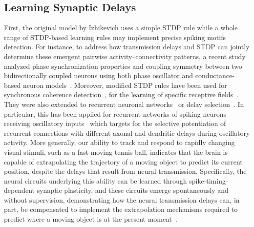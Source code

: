 \documentclass[brainsci, %
               review,accept,pdftex,moreauthors
               ]{Definitions/mdpi}
\begin{document}
% 
\subsection{Learning Synaptic Delays}
First, the original model by Izhikevich uses a simple STDP rule while a whole range of STDP-based learning rules may implement precise spiking motifs detection. For instance, to address how transmission delays and STDP can jointly determine these emergent pairwise activity--connectivity patterns, a recent study analyzed phase synchronization properties and coupling symmetry between two bidirectionally coupled neurons using both phase oscillator and conductance-based neuron models~\citep{madadi_asl_delay-dependent_2022}. Moreover, modified STDP rules have been used for synchronous coherence detection~\citep{perrinet_coherence_2002}, for the learning of specific receptive fields~\citep{perrinet_networks_2001}. They were also extended to recurrent neuronal networks~\citep{gilson_stdp_2010} or delay selection~\citep{datadien_right_2011}. In particular, this has been applied for recurrent networks of spiking neurons receiving oscillatory inputs~\citep{kerr_delay_2013} which targets for the selective potentiation of recurrent connections with different axonal and dendritic delays during oscillatory activity. More generally, our ability to track and respond to rapidly changing visual stimuli, such as a fast-moving tennis ball, indicates that the brain is capable of extrapolating the trajectory of a moving object to predict its current position, despite the delays that result from neural transmission. Specifically, the neural circuits underlying this ability can be learned through spike-timing-dependent synaptic plasticity, and these circuits emerge spontaneously and without supervision, demonstrating how the neural transmission delays can, in part, be compensated to implement the extrapolation mechanisms required to predict where a moving object is at the present moment~\citep{burkitt_predictive_2021}.
\end{document}
